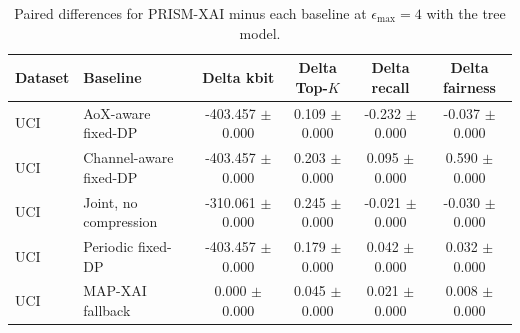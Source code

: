 \begin{table}[t]
\caption{Paired differences for PRISM-XAI minus each baseline at $\epsilon_{\max}=4$ with the tree model.}
\label{tab:paired-differences}
\centering
\scriptsize
\setlength{\tabcolsep}{3pt}
\begin{tabular}{llcccc}
\toprule
Dataset & Baseline & Delta kbit & Delta Top-$K$ & Delta recall & Delta fairness \\
\midrule
UCI & AoX-aware fixed-DP & -403.457 $\pm$ 0.000 & 0.109 $\pm$ 0.000 & -0.232 $\pm$ 0.000 & -0.037 $\pm$ 0.000 \\
UCI & Channel-aware fixed-DP & -403.457 $\pm$ 0.000 & 0.203 $\pm$ 0.000 & 0.095 $\pm$ 0.000 & 0.590 $\pm$ 0.000 \\
UCI & Joint, no compression & -310.061 $\pm$ 0.000 & 0.245 $\pm$ 0.000 & -0.021 $\pm$ 0.000 & -0.030 $\pm$ 0.000 \\
UCI & Periodic fixed-DP & -403.457 $\pm$ 0.000 & 0.179 $\pm$ 0.000 & 0.042 $\pm$ 0.000 & 0.032 $\pm$ 0.000 \\
UCI & MAP-XAI fallback & 0.000 $\pm$ 0.000 & 0.045 $\pm$ 0.000 & 0.021 $\pm$ 0.000 & 0.008 $\pm$ 0.000 \\
\bottomrule
\end{tabular}
\end{table}

